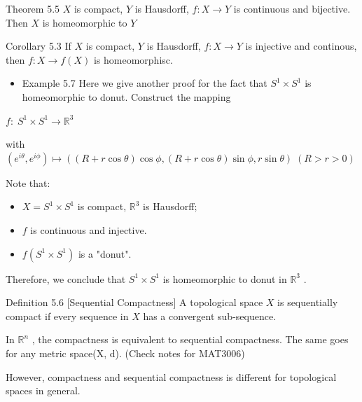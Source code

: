 Theorem 5.5 \(X\) is compact, \(Y\) is Hausdorff, \(f : X \rightarrow  Y\) is continuous and bijective. Then \(X\) is homeomorphic to \(Y\)

Corollary 5.3 If \(X\) is compact, \(Y\) is Hausdorff, \(f : X \rightarrow  Y\) is injective and continous, then \(f : X \rightarrow  f\left( X\right)\) is homeomorphisc.

\begin{itemize}
\item Example 5.7 Here we give another proof for the fact that \({S}^{1} \times  {S}^{1}\) is homeomorphic to donut. Construct the mapping
\end{itemize}

\(f : \;{S}^{1} \times  {S}^{1} \rightarrow  {\mathbb{R}}^{3}\)

with \(\left( {{e}^{i\theta },{e}^{i\phi }}\right)  \mapsto  \left( {\left( {R + r\cos \theta }\right) \cos \phi ,\left( {R + r\cos \theta }\right) \sin \phi ,r\sin \theta }\right) \;\left( {R > r > 0}\right)\)

Note that:

\begin{itemize}
\item \(X = {S}^{1} \times  {S}^{1}\) is compact, \({\mathbb{R}}^{3}\) is Hausdorff;
\end{itemize}

\begin{itemize}
\item \(f\) is continuous and injective.
\end{itemize}

\begin{itemize}
\item \(f\left( {{S}^{1} \times  {S}^{1}}\right)\) is a "donut".
\end{itemize}

Therefore, we conclude that \({S}^{1} \times  {S}^{1}\) is homeomorphic to donut in \({\mathbb{R}}^{3}\) .

Definition 5.6 [Sequential Compactness] A topological space \(X\) is sequentially compact if every sequence in \(X\) has a convergent sub-sequence.

In \({\mathbb{R}}^{n}\) , the compactness is equivalent to sequential compactness. The same goes for any metric space(X, d). (Check notes for MAT3006)

However, compactness and sequential compactness is different for topological spaces in general.